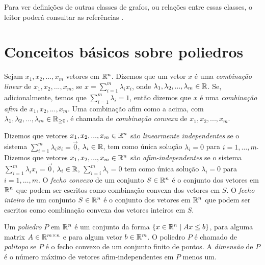 Para ver definições de outras classes de grafos, ou relações entre essas classes, o leitor poderá consultar as referências \cite{BrandstadtLS1999,BrandstadtDLL2004,GrossYZ2013}.


\section{Conceitos básicos sobre poliedros}
\label{sec:poliedros}

Sejam $x_1, x_2, ..., x_m$ vetores em $\mathbb{R}^n$. Dizemos que um vetor $x$
é uma \emph{combinação linear} de $x_1, x_2, ..., x_m$, se 
$x = \sum_{i=1}^{m}\lambda_i x_i$, onde $\lambda_1, \lambda_2, ..., \lambda_m \in \mathbb{R}$. Se, adicionalmente, temos que  $\sum_{i=1}^{m} \lambda_i = 1$, então dizemos que $x$ é uma \emph{combinação afim} de $x_1, x_2, ..., x_m$. Uma combinação afim como a acima, com $\lambda_1, \lambda_2, ..., \lambda_m \in \mathbb{R}_{\ge 0}$, é chamada de \emph{combinação convexa} de $x_1, x_2, ..., x_m$.



Dizemos que vetores $x_1, x_2, ..., x_m \in \mathbb{R}^n$ são
\emph{linearmente independentes} se o sistema $\sum_{i = 1}^{m}
\lambda_i x_i = \vec{0}$, $\lambda_i \in \mathbb{R}$, tem como única
solução $\lambda_i = 0$ para $i = 1,\ldots,m$. Dizemos que vetores
$x_1, x_2, ..., x_m \in \mathbb{R}^n$ são \emph{afim-independentes} se o
sistema $\sum_{i = 1}^{m} \lambda_i x_i = \vec{0}$, $\lambda_i \in
\mathbb{R}$, $\sum_{i = i}^{m} \lambda_i = 0$ tem como única solução
$\lambda_i = 0$ para $i = 1, \ldots,m$.  O \emph{fecho convexo} de um
conjunto $S \in \mathbb{R}^n$ é o conjunto dos vetores em $\mathbb{R}^n$ que
podem ser escritos como combinação convexa dos vetores em $S$.
 O \emph{fecho inteiro} de um
conjunto $S \in \mathbb{R}^n$ é o conjunto dos vetores em $\mathbb{R}^n$ que
podem ser escritos como combinação convexa dos vetores inteiros em $S$.

Um \emph{poliedro} $P$ em $\mathbb{R}^n$ é um conjunto da forma $\{x \in \mathbb{R}^n \; | \; Ax \le b\}$, para alguma matrix $A \in \mathbb{R}^{m \times n}$ e para algum vetor $b \in \mathbb{R}^{m}$. O poliedro $P$ é chamado de \emph{politopo} se $P$ é o fecho convexo de um conjunto finito de pontos.  A \emph{dimensão} de $P$ é o número máximo de vetores afim-independentes em $P$ menos um.

